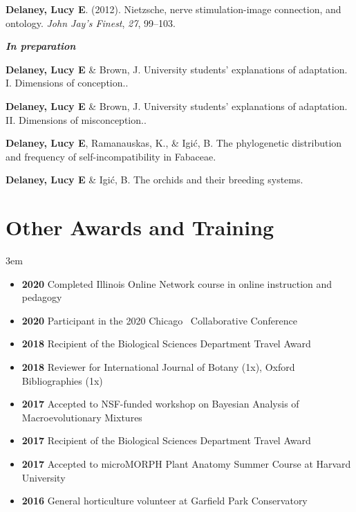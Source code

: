 \documentclass[]{article}
\newlength{\cslhangindent}
\newenvironment{cslreferences}
{\setlength{\parindent}{0pt}
\everypar{\setlength{\hangindent}{\cslhangindent}}\ignorespaces}
{\par}
\begin{document}
\begin{cslreferences}
\textbf{Delaney, Lucy E}. (2012). Nietzsche, nerve stimulation-image connection, and ontology. \emph{John Jay's Finest}, \emph{27}, 99--103. \href{https://ledelaney.org/static/docs/Delaney-JJAYFinest.pdf}{\faFile}\\
\end{cslreferences}

\textbf{\textit{In preparation}}
\vspace{2mm}

\begin{cslreferences}

\textbf{Delaney, Lucy E} \& Brown, J. University students' explanations of adaptation. I. Dimensions of conception..

\textbf{Delaney, Lucy E} \& Brown, J. University students' explanations of adaptation. II. Dimensions of misconception..

\textbf{Delaney, Lucy E}, Ramanauskas, K., \& Igić, B. The phylogenetic distribution and frequency of self-incompatibility in Fabaceae.

\textbf{Delaney, Lucy E} \& Igić, B. The orchids and their breeding systems.\\
\end{cslreferences}
\vspace{2mm}

\section{Other Awards and Training}

\vspace{2mm}
\leftskip 3em

\begin{itemize}[label=$\mathwitch*$]
\item{\textbf{2020} Completed Illinois Online Network course in online instruction and pedagogy}
\item{\textbf{2020} Participant in the 2020 Chicago \textcolor{light-gray}{\faRProject}\ Collaborative Conference \href{https://chircollab.github.io/}{\faLink}}
\item{\textbf{2018} Recipient of the Biological Sciences Department Travel Award}
\item{\textbf{2018} Reviewer for International Journal of Botany (1x), Oxford Bibliographies (1x)}
\item{\textbf{2017} Accepted to NSF-funded workshop on Bayesian Analysis of Macroevolutionary Mixtures \href{http://bamm-project.org/index.html}{\faLink}}
\item{\textbf{2017} Recipient of the Biological Sciences Department Travel Award}
\item{\textbf{2017} Accepted to microMORPH Plant Anatomy Summer Course at Harvard University \href{https://web.archive.org/web/20170922060558/http://arboretum.harvard.edu/tracing-evolution-form-function/"}{\faLink}}
\item{\textbf{2016} General horticulture volunteer at Garfield Park Conservatory \href{https://garfieldconservatory.org/}{\faLink}}
\end{itemize}
\end{document}
